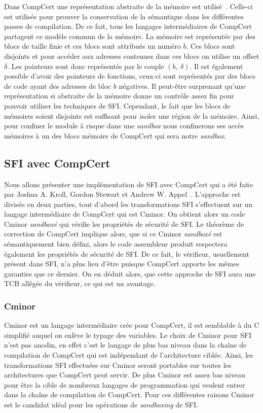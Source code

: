 \documentclass[11pt]{sdm}
\begin{document}
Dans CompCert une représentation abstraite de la mémoire est utilisé~\cite{compCert_memory_model}. Celle-ci est utilisée pour prouver la conservation de la sémantique dans les différentes passes de compilation. De ce fait, tous les langages intermédiaires de CompCert partagent ce modèle commun de la mémoire. La mémoire est représentée par des blocs de taille finie et ces blocs sont attribués un numéro $b$. Ces blocs sont disjoints et pour accéder aux adresses contenues dans ces blocs on utilise un offset $\delta$. Les pointeurs sont donc représentés par le couple $(b,~\delta)$. Il est également possible d'avoir des pointeurs de fonctions, ceux-ci sont représentés par des blocs de code ayant des adresses de bloc $b$ négatives.
Il peut-être surprenant qu'une représentation si abstraite de la mémoire donne un contrôle assez fin pour pouvoir utiliser les techniques de SFI. Cependant, le fait que les blocs de mémoires soient disjoints est suffisant pour isoler une région de la mémoire. Ainsi, pour confiner le module à risque dans une \textit{sandbox} nous confinerons ses accès mémoires à un des blocs mémoire de CompCert qui sera notre \textit{sandbox}.


\subsection{SFI avec CompCert}

Nous allons présenter une implémentation de SFI avec CompCert qui a été faite par Joshua A. Kroll, Gordon Stewart et Andrew W. Appel~\cite{Kroll:2014:PSF:2708449.2708686}.
 L'approche est divisée en deux parties, tout d'abord les transformations SFI s'effectuent sur un langage intermédiaire de CompCert qui est Cminor. On obtient alors un code Cminor \textit{sandboxé} qui vérifie les propriétés de sécurité de SFI. Le théorème de correction de CompCert implique alors, que si ce Cminor \textit{sandboxé} est sémantiquement bien défini, alors le code assembleur produit respectera également les propriétés de sécurité de SFI.
 De ce fait, le vérifieur, usuellement présent dans SFI, n'a plus lieu d'être puisque CompCert apporte les mêmes garanties que ce dernier. On en déduit alors, que cette approche de SFI aura une TCB allégée du vérifieur, ce qui est un avantage.

\subsubsection{Cminor}
Cminor est un langage intermédiaire crée pour CompCert, il est semblable à du C simplifié auquel on enlève le typage des variables.
Le choix de Cminor pour SFI n'est pas anodin, en effet c'est le langage de plus bas niveau dans la chaîne de compilation de CompCert qui est indépendant de l'architecture ciblée. Ainsi, les transformations SFI effectuées sur Cminor seront portables sur toutes les architectures que CompCert peut servir.
De plus Cminor est assez bas niveau pour être la cible de nombreux langages de programmation qui veulent entrer dans la chaîne de compilation de CompCert.
Pour ces différentes raisons Cminor est le candidat idéal pour les opérations de \textit{sandboxing} de SFI.
\end{document}
